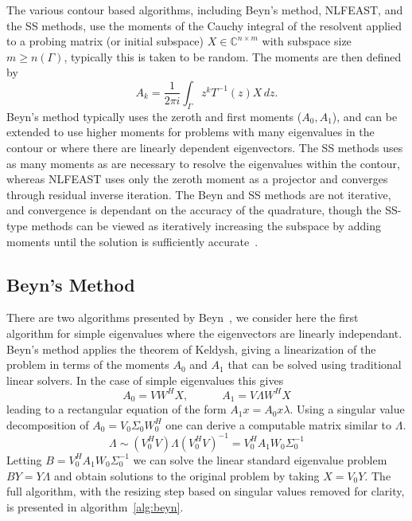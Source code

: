 \documentclass[onefignum,onetabnum]{siamart190516}
\begin{document}
    
    The various contour based algorithms, including Beyn's method, NLFEAST, and the SS methods, use the moments of the Cauchy integral of the resolvent applied to a probing matrix (or initial subspace) \( X \in \mathbb{C}^{n\times m} \) with subspace size \(m\geq n(\Gamma)\), typically this is taken to be random.
    The moments are then defined by
\begin{equation}\label{eq:moments}
	A_k = \frac{1}{2 \pi i} \int_{\Gamma} z^k T^{-1}(z) X \, dz.
\end{equation}
Beyn's method typically uses the zeroth and first moments (\( A_0, A_1 \)), and can be extended to use higher moments for problems with many eigenvalues in the contour or where there are linearly dependent eigenvectors.
The SS methods uses as many moments as are necessary to resolve the eigenvalues within the contour, whereas NLFEAST uses only the zeroth moment as a projector and converges through residual inverse iteration.
The Beyn and SS methods are not iterative, and convergence is dependant on the accuracy of the quadrature, though the SS-type methods can be viewed as iteratively increasing the subspace by adding moments until the solution is sufficiently accurate~\cite{saad2019}. 

\subsection{Beyn's Method}

There are two algorithms presented by Beyn~\cite{beyn2012}, we consider here the first algorithm for simple eigenvalues where the eigenvectors are linearly independant. Beyn's method applies the theorem of Keldysh, giving a linearization of the problem in terms of the moments \( A_0 \) and \( A_1 \) that can be solved using traditional linear solvers.
In the case of simple eigenvalues this gives
\begin{equation}
	A_0 = V W^H X,
	\quad\quad\quad
	A_1 = V \Lambda W^H X
\end{equation}
leading to a rectangular equation of the form \(A_1x = A_0x \lambda\).
Using a singular value decomposition of \( A_0 = V_0 \Sigma_0 W_0^H \) one can derive a computable matrix similar to \( \Lambda \).
\begin{equation}\label{eq:beyn}
	\Lambda \sim (V_0^H V) \Lambda {(V_0^H V)}^{-1} = V_0^H A_1 W_0 \Sigma_0^{-1} 
\end{equation}
Letting \( B = V_0^H A_1 W_0 \Sigma_0^{-1} \) we can solve the linear standard eigenvalue problem \( BY = Y\Lambda \) and obtain solutions to the original problem by taking \( X = V_0 Y \).
The full algorithm, with the resizing step based on singular values removed for clarity, is presented in algorithm~\ref{alg:beyn}. 
\end{document}
